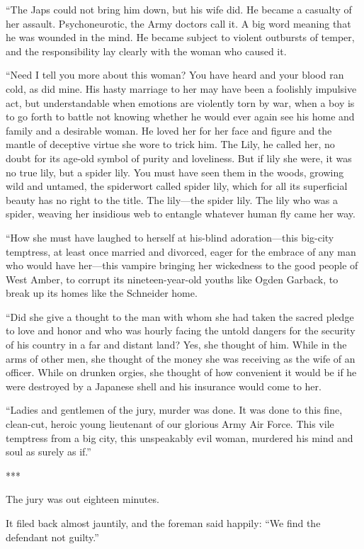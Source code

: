 \documentclass{novel}
\begin{document}
{“The Japs could not bring him down, but his wife did. He became a casualty of her assault. Psychoneurotic, the Army doctors call it. A big word meaning that he was wounded in the mind. He became subject to violent outbursts of temper, and the responsibility lay clearly with the woman who caused it.

“Need I tell you more about this woman? You have heard and your blood ran cold, as did mine. His hasty marriage to her may have been a foolishly impulsive act, but understandable when emotions are violently torn by war, when a boy is to go forth to battle not knowing whether he would ever again see his home and family and a desirable woman. He loved her for her face and figure and the mantle of deceptive virtue she wore to trick him. The Lily, he called her, no doubt for its age-old symbol of purity and loveliness. But if lily she were, it was no true lily, but a spider lily. You must have seen them in the woods, growing wild and untamed, the spiderwort called spider lily, which for all its superficial beauty has no right to the title. The lily—the spider lily. The lily who was a spider, weaving her insidious web to entangle whatever human fly came her way.

“How she must have laughed to herself at his-blind adoration—this big-city temptress, at least once married and divorced, eager for the embrace of any man who would have her—this vampire bringing her wickedness to the good people of West Amber, to corrupt its nineteen-year-old youths like Ogden Garback, to break up its homes like the Schneider home.

“Did she give a thought to the man with whom she had taken the sacred pledge to love and honor and who was hourly facing the untold dangers for the security of his country in a far and distant land? Yes, she thought of him. While in the arms of other men, she thought of the money she was receiving as the wife of an officer. While on drunken orgies, she thought of how convenient it would be if he were destroyed by a Japanese shell and his insurance would come to her.

“Ladies and gentlemen of the jury, murder was done. It was done to this fine, clean-cut, heroic young lieutenant of our glorious Army Air Force. This vile temptress from a big city, this unspeakably evil woman, murdered his mind and soul as surely as if.”

***

The jury was out eighteen minutes.

It filed back almost jauntily, and the foreman said happily: “We find the defendant not guilty.”

}
\end{document}
